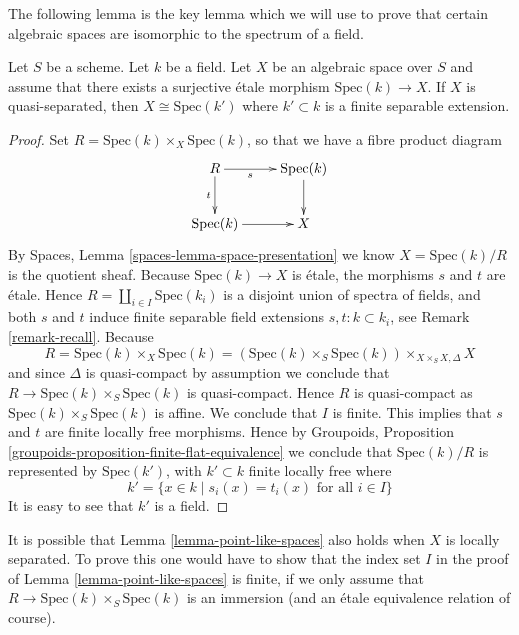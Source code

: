 \noindent
The following lemma is the key lemma which we will use to prove that
certain algebraic spaces are isomorphic to the spectrum of a field.

\begin{lemma}
\label{lemma-point-like-spaces}
Let $S$ be a scheme. Let $k$ be a field.
Let $X$ be an algebraic space over $S$ and assume that there exists
a surjective \'etale morphism $\text{Spec}(k) \to X$.
If $X$ is quasi-separated, then $X \cong \text{Spec}(k')$
where $k' \subset k$ is a finite separable extension.
\end{lemma}

\begin{proof}
Set $R = \text{Spec}(k) \times_X \text{Spec}(k)$, so that we have a
fibre product diagram
$$
\xymatrix{
R \ar[r]_-s \ar[d]_-t & \text{Spec}(k) \ar[d] \\
\text{Spec}(k) \ar[r] & X
}
$$
By Spaces, Lemma \ref{spaces-lemma-space-presentation}
we know $X = \text{Spec}(k)/R$ is the quotient sheaf.
Because $\text{Spec}(k) \to X$ is \'etale, the morphisms $s$ and $t$ are
\'etale. Hence $R = \coprod_{i \in I} \text{Spec}(k_i)$ is a disjoint
union of spectra of fields, and both $s$ and $t$
induce finite separable field extensions $s, t : k \subset k_i$,
see Remark \ref{remark-recall}. Because
$$
R = \text{Spec}(k) \times_X \text{Spec}(k)
= (\text{Spec}(k) \times_S \text{Spec}(k)) \times_{X \times_S X, \Delta} X
$$
and since $\Delta$ is quasi-compact by assumption we conclude that
$R \to \text{Spec}(k) \times_S \text{Spec}(k)$ is quasi-compact.
Hence $R$ is quasi-compact as $\text{Spec}(k) \times_S \text{Spec}(k)$ is
affine. We conclude that $I$ is finite. This implies
that $s$ and $t$ are finite locally free morphisms. Hence by
Groupoids, Proposition \ref{groupoids-proposition-finite-flat-equivalence}
we conclude that $\text{Spec}(k)/R$ is
represented by $\text{Spec}(k')$, with $k' \subset k$ finite locally free
where
$$
k' = \{x \in k \mid s_i(x) = t_i(x)\text{ for all }i \in I\}
$$
It is easy to see that $k'$ is a field.
\end{proof}

\begin{remark}
\label{remark-cannot-decide-yet}
It is possible that
Lemma \ref{lemma-point-like-spaces}
also holds when $X$ is locally separated. To prove this one would
have to show that the index set $I$ in the proof of
Lemma \ref{lemma-point-like-spaces}
is finite, if we only assume that
$R \to \text{Spec}(k) \times_S \text{Spec}(k)$ is an immersion (and an \'etale
equivalence relation of course).
\end{remark}

